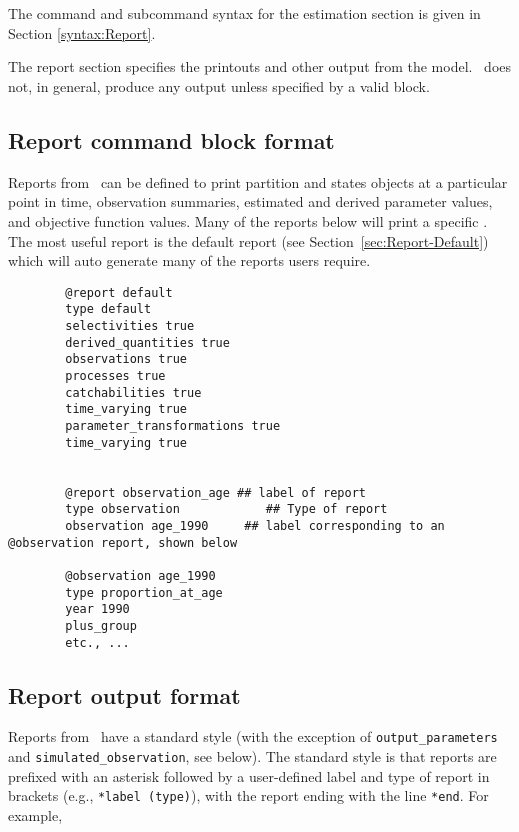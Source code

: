 \section{\label{sec:Report}}

The command and subcommand syntax for the estimation section is given in Section \ref{syntax:Report}.

The report section specifies the printouts and other output from the model. \CNAME\ does not, in general, produce any output unless specified by a valid  block.

\subsection{Report command block format}

Reports from \CNAME\ can be defined to print partition and states objects at a particular point in time, observation summaries, estimated and derived parameter values, and objective function values. Many of the reports below will print a specific \command{}. The most useful report is the default report (see Section~\ref{sec:Report-Default}) which will auto generate many of the reports users require.

\begin{verbatim}
		@report default
		type default
		selectivities true
		derived_quantities true
		observations true
		processes true
		catchabilities true
		time_varying true
		parameter_transformations true
		time_varying true
		
		
		@report observation_age ## label of report
		type observation		    ## Type of report
		observation age_1990	 ## label corresponding to an @observation report, shown below

		@observation age_1990
		type proportion_at_age
		year 1990
		plus_group
		etc., ...
\end{verbatim}

\subsection{Report output format}

Reports from \CNAME\ have a standard style (with the exception of \texttt{output\_parameters} and \texttt{simulated\_observation}, see below). The standard style is that reports are prefixed with an asterisk followed by a user-defined label and type of report in brackets (e.g., \texttt{*label (type)}), with the report ending with the line \texttt{*end}. For example,

